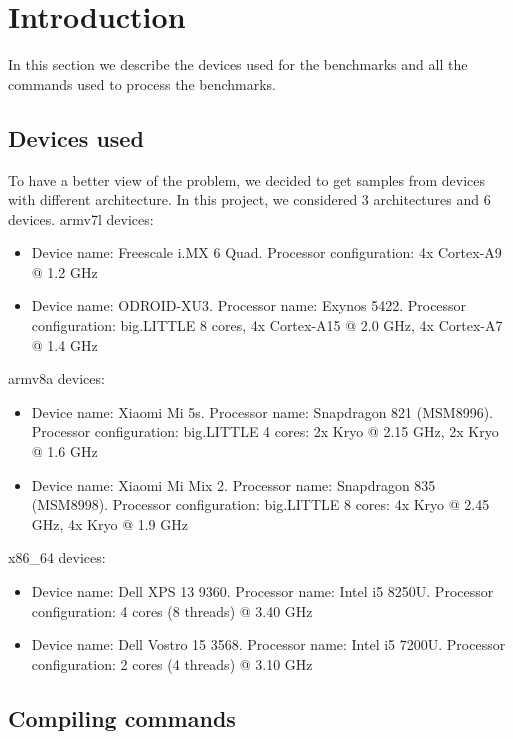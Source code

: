 \section{Introduction}

In this section we describe the devices used for the benchmarks and all the commands used to process the benchmarks.

\subsection{Devices used}

To have a better view of the problem, we decided to get samples from devices with different architecture.
In this project, we considered 3 architectures and 6 devices.\newline 
armv7l devices:
\begin{itemize}
	\item Device name: Freescale i.MX 6 Quad. Processor configuration: 4x Cortex-A9 @ 1.2 GHz
	\item Device name: ODROID-XU3. Processor name: Exynos 5422. Processor configuration: big.LITTLE 8 cores, 4x Cortex-A15 @ 2.0 GHz, 4x Cortex-A7 @ 1.4 GHz 
\end{itemize}
armv8a devices:
\begin{itemize}
	\item Device name: Xiaomi Mi 5s. Processor name: Snapdragon 821 (MSM8996). Processor configuration: big.LITTLE 4 cores: 2x Kryo @ 2.15 GHz, 2x Kryo @ 1.6 GHz
	\item Device name: Xiaomi Mi Mix 2. Processor name: Snapdragon 835 (MSM8998). Processor configuration: big.LITTLE 8 cores: 4x Kryo @ 2.45 GHz, 4x Kryo @ 1.9 GHz
\end{itemize}
x86\_64 devices:
\begin{itemize}
	\item Device name: Dell XPS 13 9360. Processor name: Intel i5 8250U. Processor configuration: 4 cores (8 threads) @ 3.40 GHz
	\item Device name: Dell Vostro 15 3568. Processor name: Intel i5 7200U.
	Processor configuration: 2 cores (4 threads) @ 3.10 GHz
\end{itemize}
\subsection{Compiling commands}


